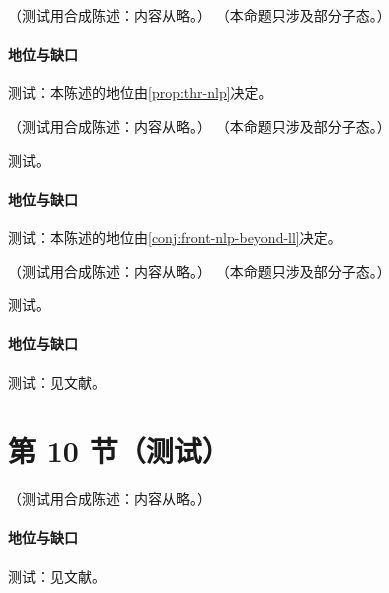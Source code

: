 \begin{proposition}\label{prop:front-nlp-threshold}
（测试用合成陈述：内容从略。）
（本命题只涉及部分子态。）
\end{proposition}
\paragraph{地位与缺口}测试：本陈述的地位由\cref{prop:thr-nlp}决定。

\begin{proposition}\label{prop:front-nlp-ll}
（测试用合成陈述：内容从略。）
（本命题只涉及部分子态。）
\end{proposition}
\begin{proofsketch}测试。\end{proofsketch}
\paragraph{地位与缺口}测试：本陈述的地位由\cref{conj:front-nlp-beyond-ll}决定。

\begin{proposition}\label{prop:front-nlp-dis}
（测试用合成陈述：内容从略。）
（本命题只涉及部分子态。）
\end{proposition}
\begin{proofsketch}测试。\end{proofsketch}
\paragraph{地位与缺口}测试：见文献。

\section{第 10 节（测试）}\label{sec:front-brst}

\begin{conjecture}\label{conj:front-nlp-beyond-ll}
（测试用合成陈述：内容从略。）
\end{conjecture}
\paragraph{地位与缺口}测试：见文献。

